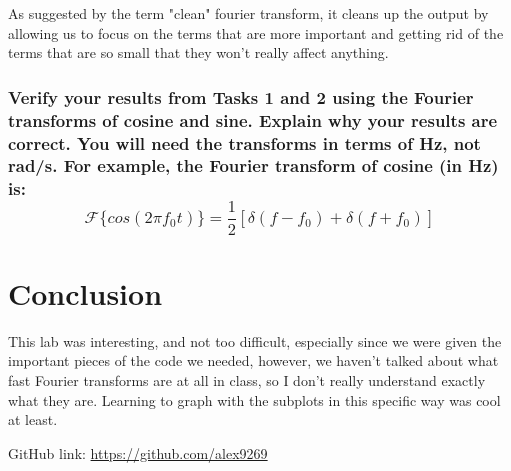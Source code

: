 \documentclass[12pt]{report}
\begin{document}
As suggested by the term "clean" fourier transform, it cleans up the output by allowing us to focus on the terms that are more important and getting rid of the terms that are so small that they won't really affect anything. 
 
 \subsubsection{Verify your results from Tasks 1 and 2 using the Fourier transforms of cosine and sine. Explain why your results are correct. You will need the transforms in terms of Hz, not rad/s. For example, the Fourier transform of cosine (in Hz) is:
$$\mathcal{F}\{cos(2πf_0t)\} = \frac{1}{2}[\delta (f − f_0) + \delta (f + f_0)]$$}
 


 \section{Conclusion}
 
This lab was interesting, and not too difficult, especially since we were given the important pieces of the code we needed, however, we haven't talked about what fast Fourier transforms are at all in class, so I don't really understand exactly what they are. Learning to graph with the subplots in this specific way was cool at least.
 
 GitHub link: \url{https://github.com/alex9269}
 
\end{document}

